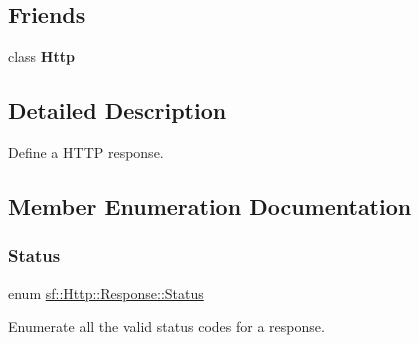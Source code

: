 \subsection*{Friends}
\begin{DoxyCompactItemize}
\item 
\mbox{\label{classsf_1_1_http_1_1_response_aba95e2a7762bb5df986048b05d03a22e}} 
class {\bfseries Http}
\end{DoxyCompactItemize}


\subsection{Detailed Description}
Define a H\+T\+TP response. 

\subsection{Member Enumeration Documentation}
\mbox{\label{classsf_1_1_http_1_1_response_a663e071978e30fbbeb20ed045be874d8}} 
\subsubsection{\texorpdfstring{Status}{Status}}
{\footnotesize\ttfamily enum \hyperlink{classsf_1_1_http_1_1_response_a663e071978e30fbbeb20ed045be874d8}{sf\+::\+Http\+::\+Response\+::\+Status}}



Enumerate all the valid status codes for a response. 

